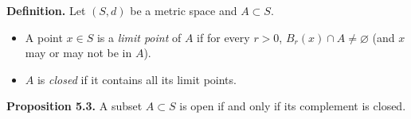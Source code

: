 \textbf{Definition.} Let $(S, d)$ be a metric space and $A \subset S$.
\begin{itemize}
\item A point $x \in S$ is a \textit{limit point} of $A$ if for every $r > 0$, $B_r(x) \cap A \neq \varnothing$ (and $x$ may or may not be in $A$).
\item $A$ is \textit{closed} if it contains all its limit points.
\end{itemize}
\textbf{Proposition 5.3.} A subset $A \subset S$ is open if and only if its complement is closed.
